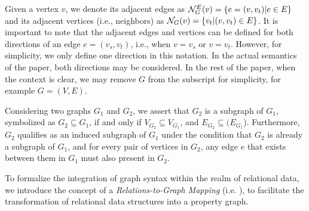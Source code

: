 Given a vertex $v$, we denote its adjacent edges as ${\mathcal{N}}_G^E(v) = \{e = (v, v_t) | e \in E\}$ and its adjacent vertices (i.e., neighbors) as ${\mathcal{N}}_G(v) = \{v_t | (v, v_t) \in E\}$. It is important to note that the adjacent edges and vertices can be defined for both directions of an edge $e = (v_s, v_t)$, i.e., when $v = v_s$ or $v = v_t$. However, for simplicity, we only define one direction in this notation. In the actual semantics of the paper, both directions may be considered.
In the rest of the paper, when the context is clear, we may remove $G$ from the subscript for simplicity, for example $G=(V, E)$.

Considering two graphs \(G_1\) and \(G_2\), we assert that \(G_2\) is a subgraph of \(G_1\), symbolized as \(G_2 \subseteq G_1\), if and only if \(V_{G_2} \subseteq V_{G_1}\), and \(E_{G_2} \subseteq (E_{G_1}\)). Furthermore, \(G_2\) qualifies as an induced subgraph of \(G_1\) under the condition that \(G_2\) is already a subgraph of \(G_1\), and for every pair of vertices in \(G_2\), any edge \(e\) that exists between them in \(G_1\) must also present in \(G_2\).

To formalize the integration of graph syntax within the realm of relational data, we introduce the concept of a \textit{Relations-to-Graph Mapping} (i.e. \rgmapping), to facilitate the transformation of relational data structures into a property graph.

